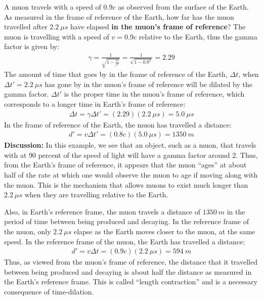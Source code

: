 \begin{example}{A muon travels with a speed of $0.9c$ as observed from the surface of the Earth. As measured in the frame of reference of the Earth, how far has the muon travelled after $\SI{2.2}{\mu s}$ have elapsed \textbf{in the muon's frame of reference}?}
The muon is travelling with a speed of $v=0.9c$ relative to the Earth, thus the gamma factor is given by:
\begin{align*}
\gamma = \frac{1}{\sqrt{1-\frac{v^2}{c^2}}} =\frac{1}{\sqrt{1-0.9^2}}=2.29
\end{align*}
The amount of time that goes by in the frame of reference of the Earth, $\Delta t$, when $\Delta t'=\SI{2.2}{\mu s}$ has gone by in the muon's frame of reference will be dilated by the gamma factor. $\Delta t'$ is the proper time in the muon's frame of reference, which corresponds to a longer time in Earth's frame of reference:
\begin{align*}
\Delta t = \gamma \Delta t' = (2.29)(\SI{2.2}{\mu s})=\SI{5.0}{\mu s}
\end{align*}
In the frame of reference of the Earth, the muon has travelled a distance:
\begin{align*}
d' = v\Delta t'=(0.8c)(\SI{5.0}{\mu s})=\SI{1350}{m}
\end{align*}
\textbf{Discussion: }In this example, we see that an object, such as a muon, that travels with at 90 percent of the speed of light will have a gamma factor around 2. Thus, from the Earth's frame of reference, it appears that the muon ``ages'' at about half of the rate at which one would observe the muon to age if moving along with the muon. This is the mechanism that allows muons to exist much longer than $\SI{2.2}{\mu s}$ when they are travelling relative to the Earth.

Also, in Earth's reference frame, the muon travels a distance of $\SI{1350}{m}$ in the period of time between being produced and decaying. In the reference frame of the muon, only $\SI{2.2}{\mu s}$ elapse as the Earth moves closer to the muon, at the same speed. In the reference frame of the muon, the Earth has travelled a distance:
\begin{align*}
d' = v\Delta t=(0.9c)(\SI{2.2}{\mu s})=\SI{594}{m}
\end{align*}
Thus, as viewed from the muon's frame of reference, the distance that it travelled between being produced and decaying is about half the distance as measured in the Earth's reference frame. This is called ``length contraction'' and is a necessary consequence of time-dilation. 
\end{example}
